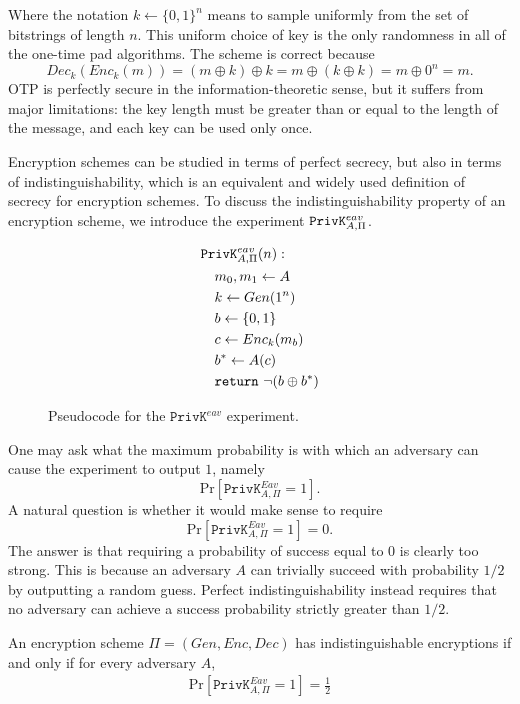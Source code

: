 Where the notation $k \gets \{0,1\}^n$ means to sample uniformly from the set of bitstrings of length $n$. This uniform choice of key is the only randomness in all of the one-time pad algorithms. The scheme is correct because 
\[ Dec_k(Enc_k(m)) = (m\oplus k)\oplus k = m \oplus (k\oplus k) = m\oplus {0}^n = m. \] OTP is perfectly secure in the information-theoretic sense, but it suffers from major limitations: the key length must be greater than or equal to the length of the message, and each key can be used only once.

Encryption schemes can be studied in terms of perfect secrecy, but also in terms of indistinguishability, which is an equivalent and widely used definition of secrecy for encryption schemes. To discuss the indistinguishability property of an encryption scheme, we introduce the experiment $\mathtt{PrivK}^{eav}_{A,\Pi}$.

\begin{figure}[htpb]
    \centering
    \begin{align*}
    &\mathtt{PrivK}^{eav}_{A,\Pi}(n): \\
    &\quad m_0, m_1 \gets A \\
    &\quad k \gets Gen(1^n) \\
    &\quad b \gets \{0,1\} \\
    &\quad c \gets Enc_k(m_b) \\
    &\quad b^* \gets A(c) \\
    &\quad \mathtt{return}\,\, \neg(b \oplus b^*)
    \end{align*}
    \caption{Pseudocode for the $\mathtt{PrivK}^{eav}$ experiment.}
    \label{fig:privk-eav-perfect-secrecy}
\end{figure}

One may ask what the maximum probability is with which an adversary can cause the experiment to output $1$, namely
\[
\mathrm{Pr}[\mathtt{PrivK}^{Eav}_{A, \Pi} = 1].
\]
A natural question is whether it would make sense to require
\[
\mathrm{Pr}[\mathtt{PrivK}^{Eav}_{A, \Pi} = 1] = 0.
\]
The answer is that requiring a probability of success equal to 0 is clearly too strong. This is because an adversary $A$ can trivially succeed with probability $1/2$ by outputting a random guess. Perfect indistinguishability instead requires that no adversary can achieve a success probability strictly greater than $1/2$.

\begin{definition}
An encryption scheme $\Pi = (Gen, Enc, Dec)$ has indistinguishable encryptions if and only if for every adversary $A$,
\begin{align}
\mathrm{Pr}[\mathtt{PrivK}^{Eav}_{A, \Pi} = 1] = \frac{1}{2}
\end{align}
\end{definition}

